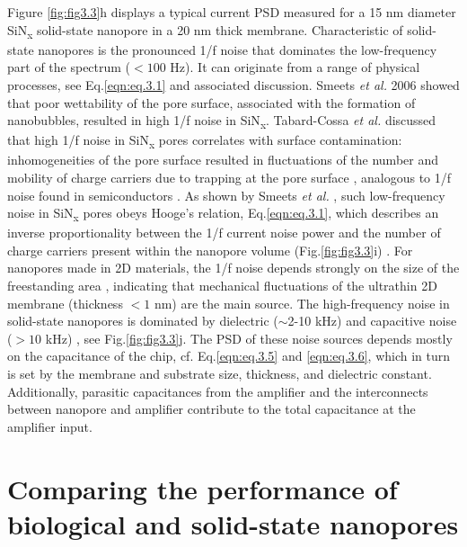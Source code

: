 Figure \ref{fig:fig3.3}h displays a typical current PSD measured for a 15 nm diameter SiN\textsubscript{x} solid-state nanopore \cite{Smeets2008} in a 20 nm thick membrane. Characteristic of solid-state nanopores is the pronounced 1/f noise that dominates the low-frequency part of the spectrum ($<100$ Hz). It can originate from a range of physical processes, see Eq.\ref{eqn:eq.3.1} and associated discussion. Smeets \emph{et al.} 2006 \cite{Smeets2006} showed that poor wettability of the pore surface, associated with the formation of nanobubbles, resulted in high 1/f noise in SiN\textsubscript{x}. Tabard-Cossa \emph{et al.} \cite{Tabard-Cossa2007} discussed that high 1/f noise in SiN\textsubscript{x} pores correlates with surface contamination: inhomogeneities of the pore surface resulted in fluctuations of the number and mobility of charge carriers due to trapping at the pore surface \cite{Fragasso2019,Tabard-Cossa2007}, analogous to 1/f noise found in semiconductors \cite{Vandamme1994}. As shown by Smeets \emph{et al.} \cite{Smeets2008,Smeets2009}, such low-frequency noise in SiN\textsubscript{x} pores obeys Hooge’s relation, Eq.\ref{eqn:eq.3.1}, which describes an inverse proportionality between the 1/f current noise power and the number of charge carriers present within the nanopore volume (Fig.\ref{fig:fig3.3}i) \cite{Hooge1976}. For nanopores made in 2D materials, the 1/f noise depends strongly on the size of the freestanding area \cite{Zhou2013,Heerema2015,Zhang2018,Garaj2013}, indicating that mechanical fluctuations of the ultrathin 2D membrane (thickness $<1$ nm) are the main source. The high-frequency noise in solid-state nanopores is dominated by dielectric ($\sim$2-10 kHz) and capacitive noise ($>10$ kHz) \cite{Balan2014,Roelen2018}, see Fig.\ref{fig:fig3.3}j. The PSD of these noise sources depends mostly on the capacitance of the chip, cf. Eq.\ref{eqn:eq.3.5} and \ref{eqn:eq.3.6}, which in turn is set by the membrane and substrate size, thickness, and dielectric constant. Additionally, parasitic capacitances from the amplifier and the interconnects between nanopore and amplifier contribute to the total capacitance at the amplifier input.


\section{Comparing the performance of biological and so\-lid-state nanopores}

